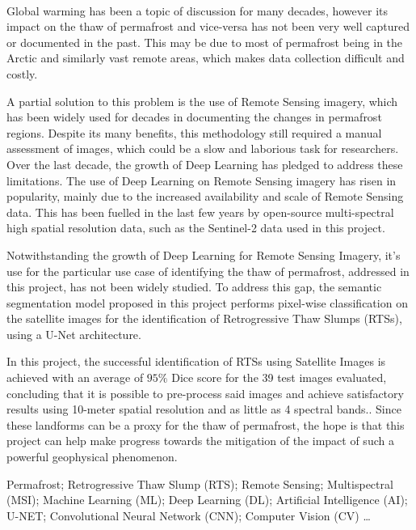 \paragraph{}
Global warming has been a topic of discussion for many decades, however its impact on the thaw of permafrost and vice-versa has not been very well captured or documented in the past. This may be due to most of permafrost being in the Arctic and similarly vast remote areas, which makes data collection difficult and costly.

A partial solution to this problem is the use of Remote Sensing imagery, which has been widely used for decades in documenting the changes in permafrost regions. Despite its many benefits, this methodology still required a manual assessment of images, which could be a slow and laborious task for researchers.
Over the last decade, the growth of Deep Learning has pledged to address these limitations. The use of Deep Learning on Remote Sensing imagery has risen in popularity, mainly due to the increased availability and scale of Remote Sensing data. This has been fuelled in the last few years by open-source multi-spectral high spatial resolution data, such as the Sentinel-2 data used in this project.

Notwithstanding the growth of Deep Learning for Remote Sensing Imagery, it’s use for the particular use case of identifying the thaw of permafrost, addressed in this project, has not been widely studied. To address this gap, the semantic segmentation model proposed in this project performs pixel-wise classification on the satellite images for the identification of Retrogressive Thaw Slumps (RTSs), using a U-Net architecture.

In this project, the successful identification of RTSs using Satellite Images is achieved with an average of $95\%$ Dice score for the 39 test images evaluated, concluding that it is possible to pre-process said images and achieve satisfactory results using 10-meter spatial resolution and as little as 4 spectral bands.. Since these landforms can be a proxy for the thaw of permafrost, the hope is that this project can help make progress towards the mitigation of the impact of such a powerful geophysical phenomenon.


\begin{keywords}
Permafrost; Retrogressive Thaw Slump (RTS); Remote Sensing;  Multispectral (MSI); Machine Learning (ML); Deep Learning (DL); Artificial Intelligence (AI); U-NET; Convolutional Neural Network (CNN); Computer Vision (CV) \ldots
\end{keywords} 
